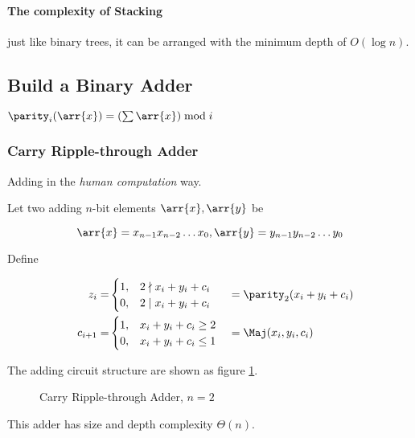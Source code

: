 \paragraph{The complexity of Stacking} just like binary trees, it can be arranged with the minimum depth of $O(\log n)$.

\subsection{Build a Binary Adder}
\begin{definition}
\(\parity_i(\arr{x}) = \left(\sum \arr{x}\right) \bmod i\)
\end{definition}

\subsubsection{Carry Ripple-through Adder}

Adding in the \emph{human computation} way. 

Let two adding $n$-bit elements $\arr{x}, \arr{y}$ be 

$$\arr{x} = x_{n-1} x_{n-2} \dots x_0, \arr{y} = y_{n-1} y_{n-2} \dots y_0$$

Define

\begin{align*}
&&z_i= & \begin{cases}
1, & 2 \nmid x_i + y_i + c_i \\ 
0, & 2 \mid x_i + y_i + c_i
\end{cases}  &&= \parity_2(x_i + y_i + c_i) \\
&&c_{i+1}= &\begin{cases}
1, & x_i + y_i + c_i \ge 2\\ 
0, & x_i + y_i + c_i \le 1
\end{cases} &&= \Maj(x_i, y_i, c_i)
\end{align*}

The adding circuit structure are shown as figure \ref{fig:c-rt-adder}.

\begin{figure}[ht]
    \centering
    \def\svgwidth{0.25\textwidth}
    
    \quad
    \def\svgwidth{0.35\textwidth}
    
    \caption{Carry Ripple-through Adder, $n=2$}
    \label{fig:c-rt-adder}
\end{figure}

This adder has size and depth complexity \by \(\Theta(n)\).

